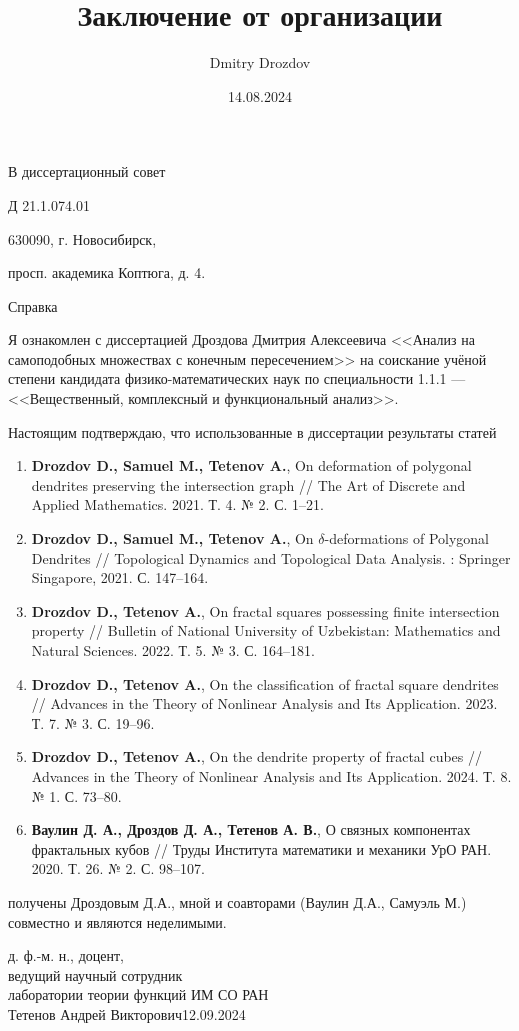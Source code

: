 \documentclass[14pt, a4paper]{extarticle}
\title{Заключение от организации}
\author{Dmitry Drozdov}
\date{14.08.2024}
\begin{document}
\noindent\hspace{9cm}В диссертационный совет

\noindent\hspace{9cm}Д 21.1.074.01

\noindent\hspace{9cm}630090, г. Новосибирск, 

\noindent\hspace{9cm}просп. академика Коптюга, д. 4.



\begin{center}
Справка 
\end{center}

Я ознакомлен с диссертацией Дроздова Дмитрия Алексеевича <<Анализ на самоподобных множествах с конечным пересечением>> на соискание учёной степени кандидата физико-математических наук по специальности 1.1.1 --- <<Вещественный, комплексный и функциональный анализ>>.

Настоящим подтверждаю, что использованные в диссертации результаты статей
\begin{enumerate}[nolistsep]
\item {\bf Drozdov D., Samuel M., Tetenov A.}, On deformation of polygonal dendrites preserving the intersection graph // The Art of Discrete and Applied Mathematics. 2021. Т. 4. № 2. С. 1--21.
\item {\bf Drozdov D., Samuel M., Tetenov A.}, On $\delta$-deformations of Polygonal Dendrites // Topological Dynamics and Topological Data Analysis. : Springer Singapore, 2021. С. 147--164.
\item {\bf Drozdov D., Tetenov A.}, On fractal squares possessing finite intersection property // Bulletin of National University of Uzbekistan: Mathematics and Natural Sciences. 2022. Т. 5. № 3. С. 164--181.
\item {\bf Drozdov D., Tetenov A.}, On the classification of fractal square dendrites // Advances in the Theory of Nonlinear Analysis and Its Application. 2023. Т. 7. № 3. С. 19--96.
\item {\bf Drozdov D., Tetenov A.}, On the dendrite property of fractal cubes // Advances in the Theory of Nonlinear Analysis and Its Application. 2024. Т. 8. № 1. С. 73--80.
\item {\bf Ваулин Д. А., Дроздов Д. А., Тетенов А. В.}, О связных компонентах фрактальных кубов // Труды Института математики и механики УрО РАН. 2020. Т. 26. № 2. С. 98--107.
\end{enumerate}
получены Дроздовым Д.А., мной и соавторами (Ваулин Д.А., Самуэль М.) совместно и являются неделимыми.

\vspace{1cm}


\noindent д. ф.-м. н., доцент,\\
\noindent ведущий научный сотрудник\\
\noindent лаборатории теории функций ИМ СО РАН\\
\noindent Тетенов Андрей Викторович\hfill 12.09.2024

\end{document}
